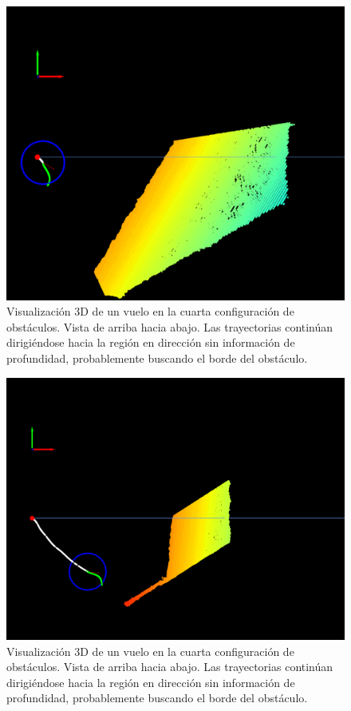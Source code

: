 \begin{figure}[H]
    \centering
    \includegraphics[scale=0.25]{partes/ImgJoao/depth-wall-3-try-arround.png}
    \caption[Visualización 3D de un vuelo en la cuarta configuración de obstáculos. Vista de arriba hacia abajo. Búsqueda del borde del obstáculo (2).]{Visualización 3D de un vuelo en la cuarta configuración de obstáculos. Vista de arriba hacia abajo. Las trayectorias continúan dirigiéndose hacia la región en dirección  sin información de profundidad, probablemente buscando el borde del obstáculo.}
    \label{depth-wall-3}
\end{figure}

\begin{figure}[H]
    \centering
    \includegraphics[scale=0.25]{partes/ImgJoao/depth-wall-4-still-go-arround.png}
    \caption[Visualización 3D de un vuelo en la cuarta configuración de obstáculos. Vista de arriba hacia abajo. Búsqueda del borde del obstáculo (3).]{Visualización 3D de un vuelo en la cuarta configuración de obstáculos. Vista de arriba hacia abajo. Las trayectorias continúan dirigiéndose hacia la región en dirección  sin información de profundidad, probablemente buscando el borde del obstáculo.}
    \label{depth-wall-4}
\end{figure}

